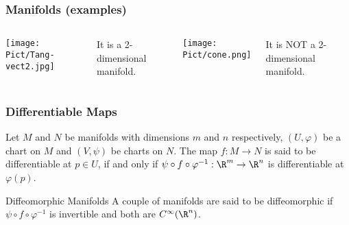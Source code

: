 \begin{frame}
  \frametitle{Manifolds (examples)}
  \begin{columns}
    \begin{center}
      \texttt{[image: Pict/Tang-vect2.jpg]}
    \end{center}
    It \alert{is} a 2-dimensional manifold.
    \begin{center}
      \texttt{[image: Pict/cone.png]}
    \end{center}
    It \alert{is NOT} a 2-dimensional manifold.
  \end{columns}
\end{frame}

\begin{frame}
  \frametitle{Differentiable Maps}
  Let $M$ and $N$ be manifolds with dimensions $m$ and $n$ respectively,  $(U,\varphi)$ be a chart on $M$ and $(V,\psi)$ be charts on $N$. The map $f:M\to N$ is said to be differentiable at $p\in U$, if and only if $\psi\circ f\circ \varphi^{-1}:\R^m\to \R^n$ is differentiable at $\varphi(p)$.

  \begin{alertblock}{Diffeomorphic Manifolds}
  A couple of manifolds are said to be diffeomorphic if $\psi\circ f\circ \varphi^{-1}$ is invertible and both are $C^\infty(\R^n)$.
  \end{alertblock}
  
\end{frame}
